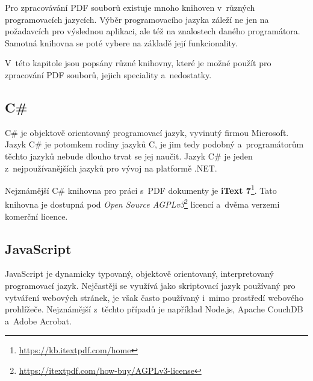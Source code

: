 Pro zpracovávání PDF souborů existuje mnoho knihoven v~různých programovacích
jazycích. Výběr programovacího jazyka záleží ne jen na požadavcích pro výslednou
aplikaci, ale též na znalostech daného programátora. Samotná knihovna se poté
vybere na základě její funkcionality. 

V~této kapitole jsou popsány různé knihovny, které je možné použít pro zpracování
PDF souborů, jejich speciality a~nedostatky.


\subsection*{C\#}

C\# je objektově orientovaný programovací jazyk, vyvinutý firmou Microsoft.
Jazyk C\# je potomkem rodiny jazyků C, je jim tedy podobný a~programátorům těchto
jazyků nebude dlouho trvat se jej naučit. Jazyk C\# je jeden z~nejpoužívanějších
jazyků pro vývoj na platformě .NET.
\cite{CSharp}

Nejznámější C\# knihovna pro práci s~PDF dokumenty je \textbf{iText 7}\footnote{
\href{https://kb.itextpdf.com/home}{https://kb.itextpdf.com/home}
}. Tato knihovna je dostupná pod \emph{Open Source AGPLv3}\footnote{
\href{https://itextpdf.com/how-buy/AGPLv3-license}{https://itextpdf.com/how-buy/AGPLv3-license}
} licencí a~dvěma verzemi komerční licence. 

\dummyText


\subsection*{JavaScript}

JavaScript je dynamicky typovaný, objektově orientovaný, interpretovaný
programovací jazyk. Nejčastěji se využívá jako skriptovací jazyk používaný
pro vytváření webových stránek, je však často používaný i~mimo prostředí webového
prohlížeče. Nejznámější z~těchto případů je například Node.js, Apache CouchDB
a~Adobe Acrobat. 
\cite{JavaScript}

